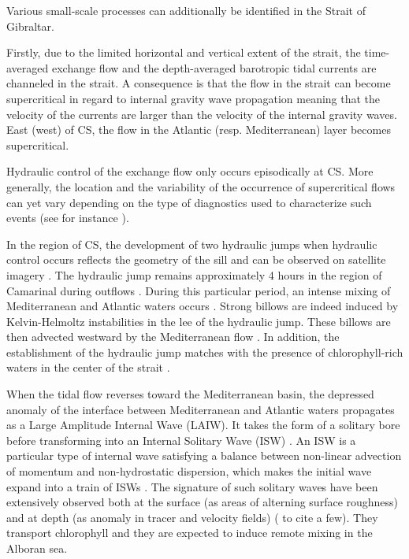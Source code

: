 Various small-scale processes can additionally be identified in the Strait of Gibraltar.

Firstly, due to the limited horizontal and vertical extent of the strait, the time-averaged exchange flow and the depth-averaged barotropic tidal currents are channeled in the strait. A consequence is that the flow in the strait can become supercritical in regard to internal gravity wave propagation meaning that the velocity of the currents are larger than the velocity of the internal gravity waves.  East (west) of CS, the flow in the Atlantic (resp. Mediterranean) layer becomes supercritical.

Hydraulic control of the exchange flow only occurs episodically at CS. More generally, the location and the variability of the occurrence of supercritical flows can yet vary depending on the type of diagnostics used to characterize such events (see for instance \citet{armi_1988,vargas_2006,sannino_2007,sanchez-roman_2012}). 

In the region of CS, the development of two hydraulic jumps when hydraulic control occurs reflects the geometry of the sill and can be observed on satellite imagery \citep{brandt_1996}. The hydraulic jump remains approximately 4 hours in the region of Camarinal during outflows \citep{armi_1988,vlasenko_2009}. During this particular period, an intense mixing of Mediterranean and Atlantic waters occurs \citep{wesson_1994,macias_2006,garcia-lafuente_2011}. Strong billows are indeed induced by Kelvin-Helmoltz instabilities in the lee of the hydraulic jump. These billows are then advected westward by the Mediterranean flow \citep{wesson_1994}. In addition, the establishment of the hydraulic jump matches with the presence of chlorophyll-rich waters in the center of the strait \citep{bruno_2013}.

When the tidal flow reverses toward the Mediterranean basin, the depressed anomaly of the interface between Mediterranean and Atlantic waters propagates as a Large Amplitude Internal Wave (LAIW). It takes the form of a solitary bore before transforming into an Internal Solitary Wave (ISW) \citep{armi_1988}. An ISW is a particular type of internal wave satisfying a balance between non-linear advection of momentum and non-hydrostatic dispersion, which makes the initial wave expand into a train of ISWs \citep{vlasenko_2000}. The signature of such solitary waves have been extensively observed both at the surface (as areas of alterning surface roughness) and at depth (as anomaly in tracer and velocity fields) (\citet{ziegenbein_1970,armi_1988,watson_1990,sanchezgarrido_2008} to cite a few). They transport chlorophyll \citep{bruno_2013} and they are expected to induce remote mixing in the Alboran sea.

